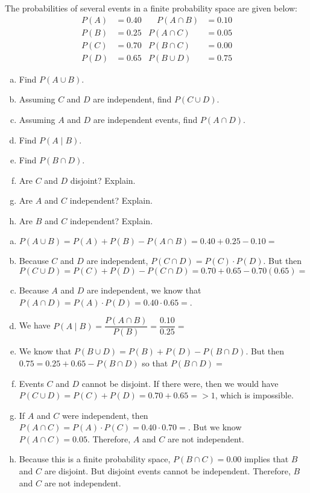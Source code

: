 \documentclass[11pt,letterpaper]{article}
\begin{document}

 The probabilities of several events in a finite probability space are given below:
	\[
	\begin{aligned}
	P(A)&= 0.40 &\quad P(A \cap B)&= 0.10 \\
	P(B)&= 0.25 & P(A \cap C)&= 0.05 \\
	P(C)&= 0.70 & P(B \cap C)&= 0.00 \\
	P(D)&= 0.65 & P(B \cup D)&= 0.75
	\end{aligned}
	\] 
\begin{enumerate}[(a)]
\item Find $P(A \cup B)$. 
\item Assuming $C$ and $D$ are independent, find $P(C \cup D)$. 
\item Assuming $A$ and $D$ are independent events, find $P(A \cap D)$.
\item Find $P(A \;|\; B)$.
\item Find $P(B \cap D)$. 
\item Are $C$ and $D$ disjoint? Explain.
\item Are $A$ and $C$ independent? Explain.
\item Are $B$ and $C$ independent? Explain.
\end{enumerate} \pspace

\sol 
\begin{enumerate}[(a)]
\item $P(A \cup B)= P(A) + P(B) - P(A \cap B)= 0.40 + 0.25 - 0.10= $

\item Because $C$ and $D$ are independent, $P(C \cap D)= P(C) \cdot P(D)$. But then $P(C \cup D)= P(C) + P(D) - P(C \cap D)= 0.70 + 0.65 - 0.70(0.65)= $

\item Because $A$ and $D$ are independent, we know that $P(A \cap D)= P(A) \cdot P(D)= 0.40 \cdot 0.65= $.

\item We have $P(A \;|\;B)= \dfrac{P(A \cap B)}{P(B)}= \dfrac{0.10}{0.25}= $

\item We know that $P(B \cup D)= P(B) + P(D) - P(B \cap D)$. But then $0.75= 0.25 + 0.65 - P(B \cap D)$ so that $P(B \cap D)= $

\item Events $C$ and $D$ cannot be disjoint. If there were, then we would have $P(C \cup D)= P(C) + P(D)= 0.70 + 0.65= > 1$, which is impossible. 

\item If $A$ and $C$ were independent, then $P(A \cap C)= P(A) \cdot P(C)= 0.40 \cdot 0.70= $. But we know $P(A \cap C)= 0.05$. Therefore, $A$ and $C$ are not independent. 

\item Because this is a finite probability space, $P(B \cap C)= 0.00$ implies that $B$ and $C$ are disjoint. But disjoint events cannot be independent. Therefore, $B$ and $C$ are not independent. 
\end{enumerate}
\end{document}
